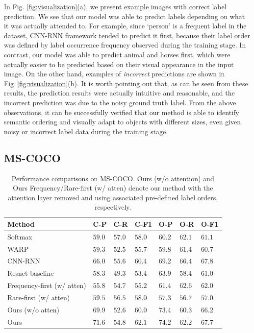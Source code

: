 \documentclass[letterpaper]{article} %
\begin{document}
In Fig. \ref{fig:visualization}(a), we present example images with correct label prediction. We see that our model was able to predict labels depending on what it was actually attended to. For example, since `person' is a frequent label in the dataset, CNN-RNN framework tended to predict it first, because their label order was defined by label occurrence frequency observed during the training stage. In contrast, our model was able to predict animal and horses first, which were actually easier to be predicted based on their visual appearance in the input image. On the other hand, examples of \emph{incorrect} predictions are shown in Fig~\ref{fig:visualization}(b). It is worth pointing out that, as can be seen from these results, the prediction results were actually intuitive and reasonable, and the incorrect prediction was due to the noisy ground truth label. From the above observations, it can be successfully verified that our method is able to identify semantic ordering and visually adapt to objects with different sizes, even given noisy or incorrect label data during the training stage.

\subsection{MS-COCO}

\tabcolsep=1.5pt
\begin{table}[]
	\centering

	\caption{Performance comparisons on MS-COCO. Ours (w/o attention) and Ours Frequency/Rare-first (w/ atten) denote our method with the attention layer removed and using associated pre-defined label orders, respectively.\\}

	\begin{tabular}{l||lll|lll}
		\hline
		Method  & C-P  & C-R  & C-F1 & O-P  & O-R  & O-F1 \\ \hline
		Softmax & $59.0$ & $57.0$ & $58.0$ & $60.2$ & $62.1$ & $61.1$ \\
		WARP     & $59.3$ & $52.5$ & $55.7$ & $59.8$ & $61.4$ & $60.7$ \\
		CNN-RNN & $66.0$ & $55.6$ & $60.4$ & $69.2$ & $66.4$ & $\mathbf{67.8}$ \\
        Resnet-baseline & $58.3$ & $49.3$ & $53.4$ & $63.9$ & $58.4$ & $61.0$ \\
        Frequency-first (w/ atten)   & $55.8$ & $54.7$ & $55.2$ & $61.4$ & $62.6$ & $62.0$ \\
        Rare-first (w/ atten)   & $59.5$ & $56.5$ & $58.0$ & $57.3$ & $56.7$ & $57.0$ \\
        Ours (w/o atten)   & $69.9$ & $52.6$ & $60.0$ & $73.4$ & $60.3$ & $66.2$ \\
		Ours    & $71.6$ & $54.8$ & $\mathbf{62.1}$ & $74.2$ & $62.2$ & $\mathbf{67.7}$ \\ \hline
	\end{tabular}
	\label{table:mscoco}
\end{table}
\end{document}
